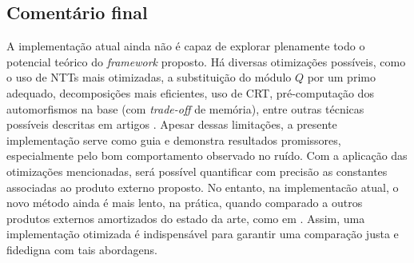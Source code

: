 \subsection{Comentário final}
A implementação atual ainda não é capaz de explorar plenamente todo o potencial teórico do \textit{framework} proposto. Há diversas otimizações possíveis, como o uso de NTTs mais otimizadas, a substituição do módulo $Q$ por um primo adequado, decomposições mais eficientes, uso de CRT, pré-computação dos automorfismos na base (com \textit{trade-off} de memória), entre outras técnicas possíveis descritas em artigos \cite{lw23II, lyubashevsky2013}. Apesar dessas limitações, a presente implementação serve como guia e demonstra resultados promissores, especialmente pelo bom comportamento observado no ruído. Com a aplicação das otimizações mencionadas, será possível quantificar com precisão as constantes associadas ao produto externo proposto. No entanto, na implementacão atual, o novo método ainda é mais lento, na prática, quando comparado a outros produtos externos amortizados do estado da arte, como em \cite{Guimaraes2023Amortized}. Assim, uma implementação otimizada é indispensável para garantir uma comparação justa e fidedigna com tais abordagens. 
